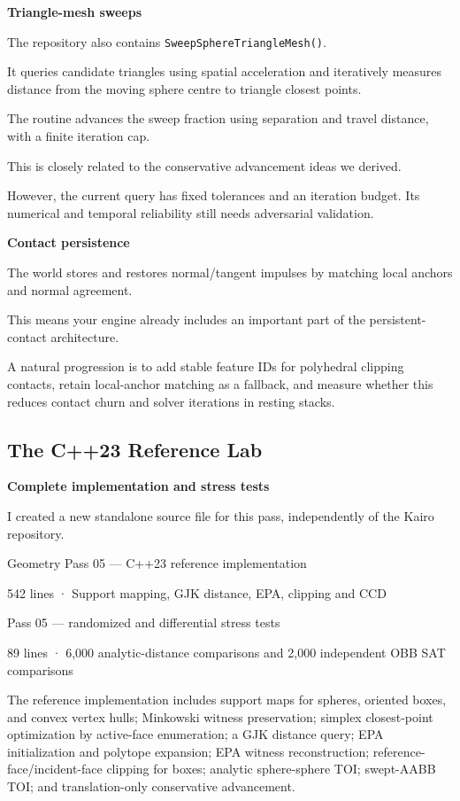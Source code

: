 \textbf{Triangle-mesh sweeps}

The repository also contains \texttt{SweepSphereTriangleMesh()}.

It queries candidate triangles using spatial acceleration and iteratively measures distance from the moving sphere centre to triangle closest points.

The routine advances the sweep fraction using separation and travel distance, with a finite iteration cap.

This is closely related to the conservative advancement ideas we derived.

However, the current query has fixed tolerances and an iteration budget. Its numerical and temporal reliability still needs adversarial validation.

\textbf{Contact persistence}

The world stores and restores normal/tangent impulses by matching local anchors and normal agreement.

This means your engine already includes an important part of the persistent-contact architecture.

A natural progression is to add stable feature IDs for polyhedral clipping contacts, retain local-anchor matching as a fallback, and measure whether this reduces contact churn and solver iterations in resting stacks.

\subsection{The C++23 Reference Lab}\label{04-visual-computing-ii-ch026-the-c23-reference-lab}

\textbf{Complete implementation and stress tests}

I created a new standalone source file for this pass, independently of the Kairo repository.

Geometry Pass 05 --- C++23 reference implementation

542 lines · Support mapping, GJK distance, EPA, clipping and CCD

Pass 05 --- randomized and differential stress tests

89 lines · 6,000 analytic-distance comparisons and 2,000 independent OBB SAT comparisons

The reference implementation includes support maps for spheres, oriented boxes, and convex vertex hulls; Minkowski witness preservation; simplex closest-point optimization by active-face enumeration; a GJK distance query; EPA initialization and polytope expansion; EPA witness reconstruction; reference-face/incident-face clipping for boxes; analytic sphere-sphere TOI; swept-AABB TOI; and translation-only conservative advancement.

